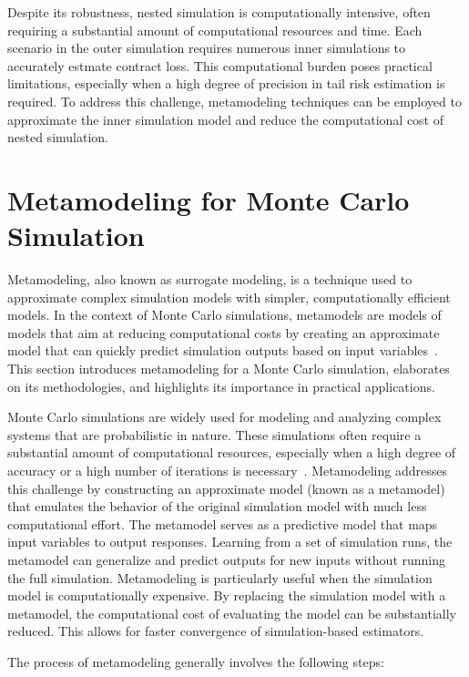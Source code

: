 Despite its robustness, nested simulation is computationally intensive, often requiring a substantial amount of computational resources and time. 
Each scenario in the outer simulation requires numerous inner simulations to accurately estmate contract loss. 
This computational burden poses practical limitations, especially when a high degree of precision in tail risk estimation is required.
To address this challenge, metamodeling techniques can be employed to approximate the inner simulation model and reduce the computational cost of nested simulation.

\section{Metamodeling for Monte Carlo Simulation}

Metamodeling, also known as surrogate modeling, is a technique used to approximate complex simulation models with simpler, computationally efficient models. 
In the context of Monte Carlo simulations, metamodels are models of models that aim at reducing computational costs by creating an approximate model that can quickly predict simulation outputs based on input variables~\citep{kleijnen2018design}. 
This section introduces metamodeling for a Monte Carlo simulation, elaborates on its methodologies, and highlights its importance in practical applications.

Monte Carlo simulations are widely used for modeling and analyzing complex systems that are probabilistic in nature. 
These simulations often require a substantial amount of computational resources, especially when a high degree of accuracy or a high number of iterations is necessary~\citep{glasserman2004monte}. 
Metamodeling addresses this challenge by constructing an approximate model (known as a metamodel) that emulates the behavior of the original simulation model with much less computational effort.
The metamodel serves as a predictive model that maps input variables to output responses. 
Learning from a set of simulation runs, the metamodel can generalize and predict outputs for new inputs without running the full simulation.
Metamodeling is particularly useful when the simulation model is computationally expensive. 
By replacing the simulation model with a metamodel, the computational cost of evaluating the model can be substantially reduced. 
This allows for faster convergence of simulation-based estimators.

The process of metamodeling generally involves the following steps:

